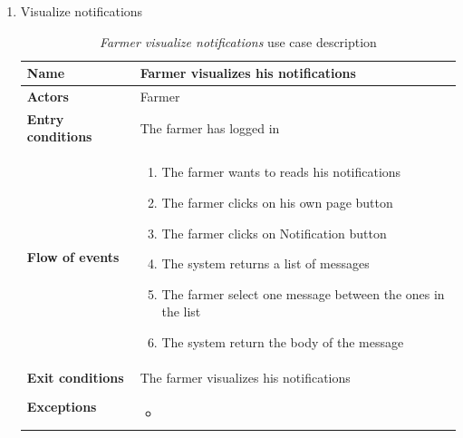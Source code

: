 \begin{enumerate}
    \item Visualize notifications
    \begin{longtable}{p{0.26\linewidth}p{0.75\linewidth}}
        \toprule
        \textbf{Name} & \textbf{Farmer visualizes his notifications} \\
        \midrule
        \textbf{Actors} & Farmer \\
        \midrule
        \textbf{Entry conditions} & The farmer has logged in\\
        \midrule
        \textbf{Flow of events} & 
        \begin{enumerate}
            \item The farmer wants to reads his notifications
            \item The farmer clicks on his own page button
            \item The farmer clicks on Notification button
            \item The system returns a list of messages
            \item The farmer select one message between the ones in the list
            \item The system return the body of the message
        \end{enumerate} \\
        \midrule
        \textbf{Exit conditions} & The farmer visualizes his notifications\\
        \midrule
        \textbf{Exceptions} & 
        \begin{itemize}
            \item 
        \end{itemize}\\
        \bottomrule
        \caption{\emph{Farmer visualize notifications} use case description}
    \end{longtable}
    \begin{figure}[H]
        \begin{center}

\end{center}
\end{figure}
\end{enumerate}
